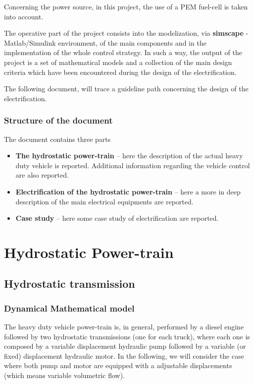 \documentclass[12pt,a4paper,oneside]{book}
\begin{document}
\begin{onehalfspace}
Concerning the power source, in this project, the use of a PEM fuel-cell is taken into account.

The operative part of the project consists into the modelization, via \textbf{simscape} - Matlab/Simulink environment, of the main components and in the implementation of the whole control strategy. In such a way, the output of the project is a set of mathematical models and a collection of the main design criteria which have been encountered during the design of the electrification. 

The following document, will trace a guideline path concerning the design of the electrification. 

\section{Structure of the document}
The document contains three parts
\begin{itemize}
	\item[--] \textbf{The hydrostatic power-train} -- here the description of the actual heavy duty vehicle is reported. Additional information regarding the vehicle control are also reported.
	\item[--] \textbf{Electrification of the hydrostatic power-train} -- here a more in deep description of the main electrical equipments are reported.
	\item[--] \textbf{Case study} -- here some case study of electrification are reported.
\end{itemize}


\part{Hydrostatic Power-train}
\chapter{Hydrostatic transmission}
\section{Dynamical Mathematical model}
The heavy duty vehicle power-train is, in general, performed by a diesel engine followed by two hydrostatic transmissions (one for each truck), where each one is composed by a variable displacement hydraulic pump followed by a variable (or fixed) displacement hydraulic motor. In the following, we will consider the case where both pump and motor are equipped with a adjustable displacements (which means variable volumetric flow). 


\end{onehalfspace}
\end{document}
